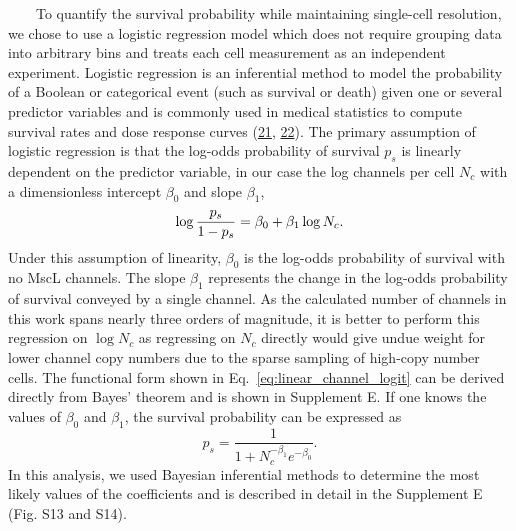 ~~~~To
quantify
the
survival
probability
while
maintaining
single-cell
resolution,
we
chose
to use
a
logistic
regression
model
which
does
not
require
grouping
data
into
arbitrary
bins
and
treats
each
cell
measurement
as an
independent
experiment.
Logistic
regression
is an
inferential
method
to
model
the
probability
of a
Boolean
or
categorical
event
(such
as
survival
or
death)
given
one or
several
predictor
variables
and is
commonly
used
in
medical
statistics
to
compute
survival
rates
and
dose
response
curves
(\protect\hyperlink{ref-anderson2003}{21},
\protect\hyperlink{ref-mishra2016}{22}).
The
primary
assumption
of
logistic
regression
is
that
the
log-odds
probability
of
survival
\(p_{s}\)
is
linearly
dependent
on the
predictor
variable,
in our
case
the
log
channels
per
cell
\(N_{c}\)
with a
dimensionless
intercept
\(\beta_0\)
and
slope
\(\beta_1\),
\begin{equation}
\log{p_s \over 1 - p_s} = \beta_0 + \beta_1 \log N_c.
\label{eq:linear_channel_logit}\end{equation}
Under
this
assumption
of
linearity,
\(\beta_0\)
is the
log-odds
probability
of
survival
with
no
MscL
channels.
The
slope
\(\beta_1\)
represents
the
change
in the
log-odds
probability
of
survival
conveyed
by a
single
channel.
As the
calculated
number
of
channels
in
this
work
spans
nearly
three
orders
of
magnitude,
it is
better
to
perform
this
regression
on
\(\log N_c\)
as
regressing
on
\(N_c\)
directly
would
give
undue
weight
for
lower
channel
copy
numbers
due to
the
sparse
sampling
of
high-copy
number
cells.
The
functional
form
shown
in
Eq.~\ref{eq:linear_channel_logit}
can be
derived
directly
from
Bayes'
theorem
and is
shown
in
Supplement
E. If
one
knows
the
values
of
\(\beta_0\)
and
\(\beta_1\),
the
survival
probability
can be
expressed
as
\begin{equation}
p_s = \frac{1}{1 + N_c^{-\beta_1}e^{-\beta_0}}.
\label{eq:prob}\end{equation}
In
this
analysis,
we
used
Bayesian
inferential
methods
to
determine
the
most
likely
values
of the
coefficients
and is
described
in
detail
in the
Supplement
E
(Fig.
S13
and
S14).

